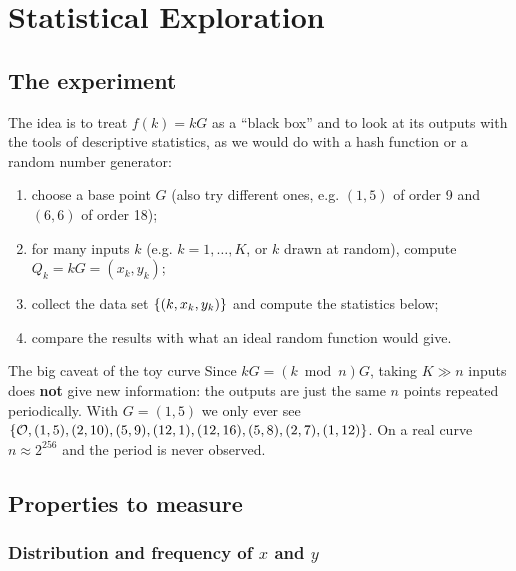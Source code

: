 \chapter{Statistical Exploration}
\label{ch:stats}


\section{The experiment}

The idea is to treat $f(k) = kG$ as a ``black box'' and to look at its outputs with the tools of descriptive statistics, as we would do with a hash function or a random number generator:
\begin{enumerate}
  \item choose a base point $G$ (also try different ones, e.g. $(1,5)$ of order 9 and $(6,6)$ of order 18);
  \item for many inputs $k$ (e.g. $k = 1, \ldots, K$, or $k$ drawn at random), compute $Q_k = kG = (x_k, y_k)$;
  \item collect the data set $\left\{(k, x_k, y_k)\right\}$ and compute the statistics below;
  \item compare the results with what an ideal random function would give.
\end{enumerate}

\begin{framedobs}{The big caveat of the toy curve}
  Since $kG = (k \bmod n) G$, taking $K \gg n$ inputs does \textbf{not} give new information: the outputs are just the same $n$ points repeated periodically. With $G = (1,5)$ we only ever see $\left\{\mathcal{O}, (1,5), (2,10), (5,9), (12,1), (12,16), (5,8), (2,7), (1,12)\right\}$. On a real curve $n \approx 2^{256}$ and the period is never observed.
\end{framedobs}

\section{Properties to measure}

\subsection{Distribution and frequency of $x$ and $y$}

